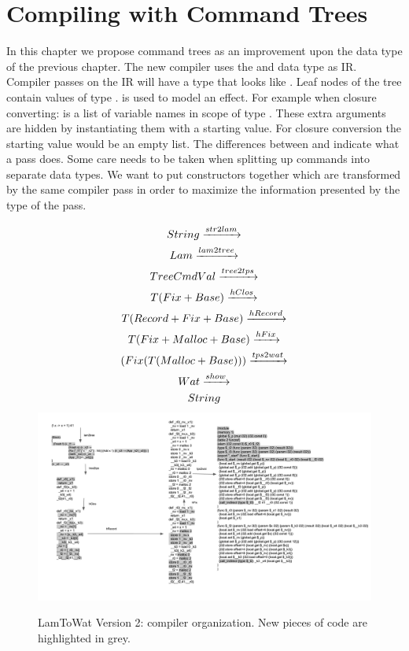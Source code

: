 
\chapter{\label{chap:treecomp}Compiling with Command Trees}

In this chapter we propose command trees as an improvement upon the  data type of the previous chapter. The new compiler uses the  and  data type as IR. Compiler passes on the IR will have a type that looks like . Leaf nodes of the tree contain values of type .  is used to model an effect. For example when closure converting:  is a list of variable names in scope of type \icode{[String]}. These extra arguments are hidden by instantiating them with a starting value. For closure conversion the starting value would be an empty list. The differences between  and  indicate what a pass does. Some care needs to be taken when splitting up commands into separate data types. We want to put constructors together which are transformed by the same compiler pass in order to maximize the information presented by the type of the pass.

\begin{figure}
\begin{gather*}
  String \xrightarrow{str2lam}\\
  Lam \xrightarrow{lam2tree}\\
  Tree Cmd Val \xrightarrow{tree2tps}\\
  T (Fix + Base) \xrightarrow{hClos}\\
  T (Record + Fix + Base) \xrightarrow{hRecord}\\
  T (Fix + Malloc + Base) \xrightarrow{hFix}\\
  (Fix (T (Malloc + Base))) \xrightarrow{tps2wat}\\
  Wat \xrightarrow{show}\\
  String
\end{gather*}
\includegraphics[width=1\textwidth]{./img/tps.png}
\caption{LamToWat Version 2: compiler organization. New pieces of code are highlighted in grey.}
\label{fig:lam2watv2org}
\end{figure}

